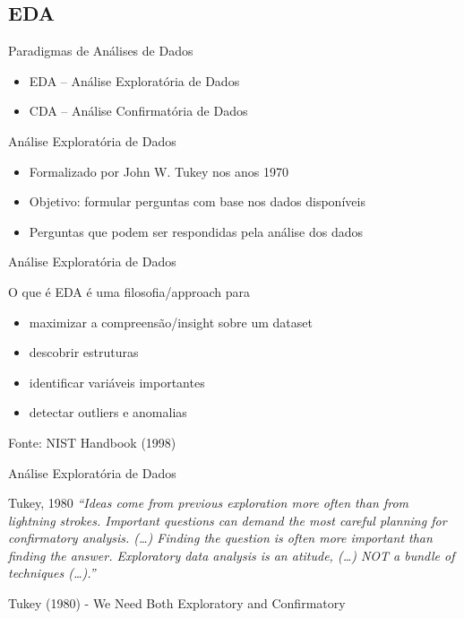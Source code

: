 \documentclass{beamer}
\begin{document}
\subsection{EDA}

\begin{frame}{Paradigmas de Análises de Dados}
  \begin{itemize}
  \item EDA -- Análise Exploratória de Dados
  \item CDA -- Análise Confirmatória de Dados
  \end{itemize}
\end{frame}

\begin{frame}{Análise Exploratória de Dados}
  \begin{itemize}
  \item Formalizado por John W. Tukey nos anos 1970
  \item Objetivo: formular perguntas com base nos dados disponíveis
  \item Perguntas que podem ser respondidas pela análise dos dados
  \end{itemize}
\end{frame}

\begin{frame}{Análise Exploratória de Dados}
  \begin{block}{O que é}
    EDA é uma filosofia/approach para
    \begin{itemize}
    \item maximizar a compreensão/insight sobre um dataset
    \item descobrir estruturas
    \item identificar variáveis importantes
    \item detectar outliers e anomalias
    \end{itemize}
  \end{block}
  Fonte: NIST Handbook (1998)
\end{frame}

\begin{frame}{Análise Exploratória de Dados}
  \begin{block}{Tukey, 1980}
    {\em ``Ideas come from previous exploration more often than from
      lightning strokes. Important questions can demand the most
      careful planning for confirmatory analysis. (\ldots) Finding the
      question is often more important than finding the
      answer. Exploratory data analysis is an atitude, (\ldots) NOT a
      bundle of techniques (\ldots).''}
  \end{block}

Tukey (1980) - We Need Both Exploratory and Confirmatory
\end{frame}
\end{document}
